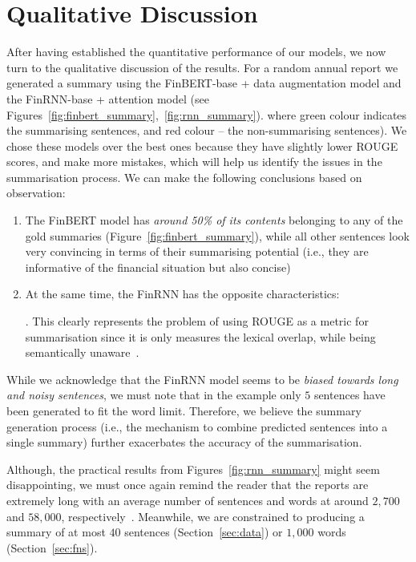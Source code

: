 \section{Qualitative Discussion}\label{sec:qualitative-discussion}
After having established the quantitative performance of our models, we now turn to the qualitative discussion of the results.
For a random annual report we generated a summary using the FinBERT-base + data augmentation model and
the FinRNN-base + attention model (see Figures~\ref{fig:finbert_summary},~\ref{fig:rnn_summary}).
where green colour indicates the summarising sentences, and red colour -- the non-summarising sentences).
We chose these models over the best ones because they have slightly lower ROUGE scores, and make more mistakes, which will help us identify the issues in the summarisation process.
We can make the following conclusions based on observation:
\begin{enumerate}
    \item The FinBERT model has \emph{around 50\% of its contents} belonging to any of the gold summaries (Figure~\ref{fig:finbert_summary}),
        while all other sentences look very convincing in terms of their summarising potential (i.e., they are informative of the financial situation but also concise)
    \item At the same time, the FinRNN has the opposite characteristics:
    .
    This clearly represents the problem of using ROUGE as a metric for summarisation since it is only measures the lexical overlap, while being semantically unaware~\cite{akter-etal-2022-revisiting}.
\end{enumerate}
While we acknowledge that the FinRNN model seems to be \emph{biased towards long and noisy sentences}, we must note that in the example
only $5$ sentences have been generated to fit the word limit.
Therefore, we believe the summary generation process (i.e., the mechanism to combine predicted sentences into a single summary) further
exacerbates the accuracy of the summarisation.

Although, the practical results from Figures~\ref{fig:rnn_summary} might seem disappointing, we must once again remind the reader that the reports are extremely
long with an average number of sentences and words at around $2,700$ and $58,000$, respectively~\cite{litvak-vanetik-2021-summarization}.
Meanwhile, we are constrained to producing a summary of at most $40$ sentences (Section~\ref{sec:data}) or $1,000$ words (Section~\ref{sec:fns}).

\newpage